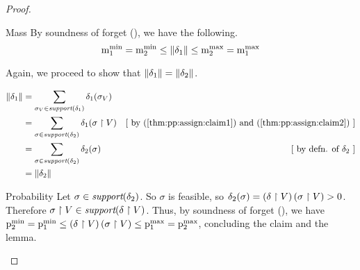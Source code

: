 \begin{proof}
\begin{subproof}{ Mass}
By soundness of forget (), we have the following.
$$ \mathrm{m}^\mathrm{min}_{1} = \mathrm{m}^\mathrm{min}_{2} \leq \mathord{\parallel}\delta_1\mathord{\parallel} \leq \mathrm{m}^\mathrm{max}_{2}
= \mathrm{m}^\mathrm{max}_{1} $$

Again, we proceed to show that $ \mathord{\parallel}\delta_1\mathord{\parallel} = \mathord{\parallel}\delta_2\mathord{\parallel}
$.

\begin{align*}
\pmass{\delta_1}
&= \sum_{\sigma_V \in \support{\delta_1}} \delta_1 (\sigma_V) \\
&= \sum_{\sigma \in \support{\delta_2}}  \delta_1
(\project{\sigma}{V}) & \mathstep{by \cnumref{thm:pp:assign:claim1} and
\cnumref{thm:pp:assign:claim2}} \\
&= \sum_{\sigma \in \support{\delta_2}} \delta_2 (\sigma)
& \mathstep{by defn. of $ \delta_2 $} \\
&= \pmass{\delta_2}
\end{align*}

\end{subproof}

\begin{subproof}{ Probability} Let
$ \sigma \in \textit{support}(\delta_2) $. So $ \sigma $ is feasible, so
$ \delta_2(\sigma) = \left( \delta \upharpoonright V \right)(\sigma \upharpoonright V)
> 0 $. Therefore
$ \sigma \upharpoonright V \in \textit{support}(\delta \upharpoonright V) $. Thus, by
soundness of forget (), we have
$ \mathrm{p}^\mathrm{min}_{2}
= \mathrm{p}^\mathrm{min}_{1} \leq \left( \delta \upharpoonright V \right)(\sigma \upharpoonright V) \leq \mathrm{p}^\mathrm{max}_{1}
= \mathrm{p}^\mathrm{max}_{2}
$, concluding the claim and the lemma.
\end{subproof}
\end{proof}

